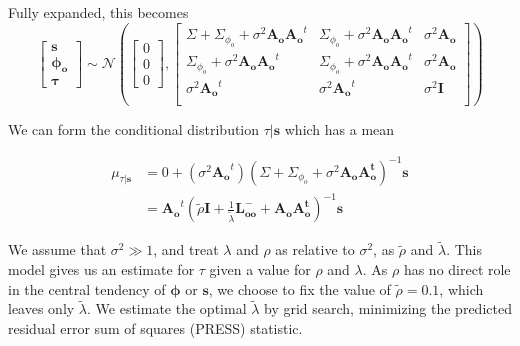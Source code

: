 \documentclass{article}
\begin{document}
    \noindent Fully expanded, this becomes
    \begin{equation}
        \begin{bmatrix}
            \mathbf{s}\\
            \mathbf{\phi_o}\\
            \mathbf{\tau}
        \end{bmatrix} \sim \mathcal{N}\left(
            \begin{bmatrix}0\\0\\0\end{bmatrix},
            \begin{bmatrix}
                \Sigma + \Sigma_{\phi_o} + \sigma^2\mathbf{A_oA_o}^t &
                \Sigma_{\phi_o} + \sigma^2\mathbf{A_oA_o}^t &
                \sigma^2\mathbf{A_o}\\
                \Sigma_{\phi_o} + \sigma^2\mathbf{A_oA_o}^t &
                \Sigma_{\phi_o} + \sigma^2\mathbf{A_oA_o}^t &
                \sigma^2\mathbf{A_o}\\
                \sigma^2\mathbf{A_o}^t & \sigma^2\mathbf{A_o}^t & \sigma^2\mathbf{I}\\
            \end{bmatrix}
        \right)\label{eqn:multivariate_gaussian_model}
    \end{equation}

    We can form the conditional distribution $\tau|\mathbf{s}$ which has a mean

    \begin{align}
        \mu_{\tau|\mathbf{s}} &= 0 + (\sigma^2\mathbf{A_o}^t)\left(
            \Sigma + \Sigma_{\phi_o} + \sigma^2\mathbf{A_oA_o^t}\right)^{-1}\mathbf{s}\\
        &= \mathbf{A_o}^t\left(
            {\tilde\rho}\mathbf{I} + \frac{1}{{\tilde\lambda}}\mathbf{L_{oo}^-} + 
            \mathbf{A_oA_o^t}
            \right)^{-1}\mathbf{s} \label{eqn:tau_given_s}
    \end{align}

        We assume that $\sigma^2 \gg 1$, and treat $\lambda$ and $\rho$
    as relative to $\sigma^2$, as ${\tilde \rho}$ and ${\tilde \lambda}$.
    This model gives us an estimate for $\tau$ given a value for
    $\rho$ and $\lambda$. As $\rho$ has no direct role in the central
    tendency of $\mathbf{\phi}$ or $\mathbf{s}$, we choose to fix the
    value of ${\tilde \rho} = 0.1$, which leaves only ${\tilde \lambda}$.
    We estimate the optimal ${\tilde \lambda}$ by grid search, minimizing
    the predicted residual error sum of squares (PRESS) statistic.
\end{document}
